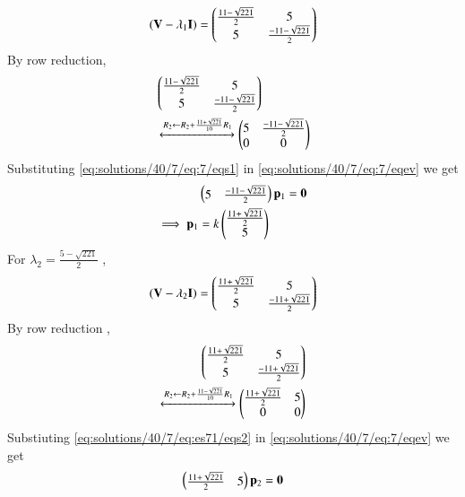 \begin{enumerate}
\begin{align}
    (\mathbf{V}-\lambda_1\mathbf{I})=\begin{pmatrix}\frac{11-\sqrt{221}}{2} & 5 \\5 & \frac{-11-\sqrt{221}}{2}\end{pmatrix}
\end{align}
By row reduction, 
\begin{align}
    &\myvec{\frac{11-\sqrt{221}}{2} & 5 \\5 & \frac{-11-\sqrt{221}}{2}}\\
 &\xleftrightarrow{R_2\leftarrow R_2+\frac{11+\sqrt{221}}{10}R_{1}}
    \myvec{5 & \frac{-11-\sqrt{221}}{2} \\ 0& 0}%
    \label{eq:solutions/40/7/eq:7/eqs1}
\end{align}
Substituting \eqref{eq:solutions/40/7/eq:7/eqs1} in \eqref{eq:solutions/40/7/eq:7/eqev} we get
\begin{align}
        & \begin{pmatrix}5 & \frac{-11-\sqrt{221}}{2} \end{pmatrix}\mathbf{p}_1=\mathbf{0}
\\
\implies \mathbf{p}_1 &= k \begin{pmatrix} \frac{11+\sqrt{221}}{2} \\ 5\end{pmatrix}
\label{eq:solutions/40/7/eq:7/eqei1}
\end{align}
For $\lambda_2=\frac{5-\sqrt{221}}{2}$ ,
\begin{align}
    (\mathbf{V}-\lambda_2\mathbf{I})=\begin{pmatrix}\frac{11+\sqrt{221}}{2} & 5 \\5 & \frac{-11+\sqrt{221}}{2}\end{pmatrix}
\end{align}
By row reduction , 
\begin{align}
     \begin{pmatrix}\frac{11+\sqrt{221}}{2} & 5 \\5 & \frac{-11+\sqrt{221}}{2}\end{pmatrix}
\\
    \xleftrightarrow{R_2\leftarrow R_2+ \frac{11-\sqrt{221}}{10}R_1}
     \begin{pmatrix}\frac{11+\sqrt{221}}{2} &5\\ 0& 0\end{pmatrix}
    \label{eq:solutions/40/7/eq:es71/eqs2}
\end{align} 
Substiuting \eqref{eq:solutions/40/7/eq:es71/eqs2} in \eqref{eq:solutions/40/7/eq:7/eqev} we get 
\begin{align}
     \myvec{\frac{11+\sqrt{221}}{2} &5}\vec{p}_2=\vec{0}

\end{align}
\end{enumerate}
